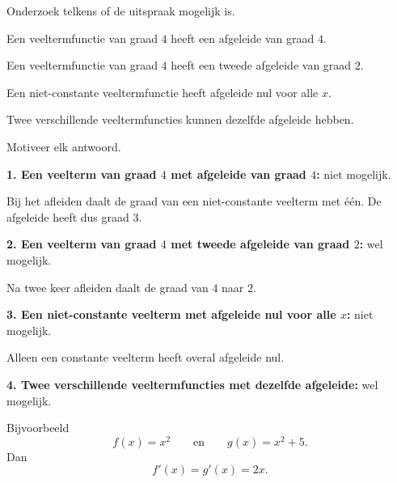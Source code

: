 \documentclass{ximera}
\begin{document}
\begin{oefening}{\oefU\ESS}

Onderzoek telkens of de uitspraak mogelijk is.

\begin{question}
Een veeltermfunctie van graad $4$ heeft een afgeleide van graad $4$.
\end{question}

\begin{question}
Een veeltermfunctie van graad $4$ heeft een tweede afgeleide van
graad $2$.
\end{question}

\begin{question}
Een niet-constante veeltermfunctie heeft afgeleide nul voor alle $x$.
\end{question}

\begin{question}
Twee verschillende veeltermfuncties kunnen dezelfde afgeleide hebben.
\end{question}

Motiveer elk antwoord.

\begin{oplossing}

\textbf{1. Een veelterm van graad $4$ met afgeleide van graad $4$:}
niet mogelijk.

Bij het afleiden daalt de graad van een niet-constante veelterm met één.
De afgeleide heeft dus graad $3$.

\medskip

\textbf{2. Een veelterm van graad $4$ met tweede afgeleide van graad $2$:}
wel mogelijk.

Na twee keer afleiden daalt de graad van $4$ naar $2$.

\medskip

\textbf{3. Een niet-constante veelterm met afgeleide nul voor alle $x$:}
niet mogelijk.

Alleen een constante veelterm heeft overal afgeleide nul.

\medskip

\textbf{4. Twee verschillende veeltermfuncties met dezelfde afgeleide:}
wel mogelijk.

Bijvoorbeeld
\[
f(x)=x^2
\qquad\text{en}\qquad
g(x)=x^2+5.
\]
Dan
\[
f'(x)=g'(x)=2x.
\]

\end{oplossing}

\end{oefening}
\end{document}
